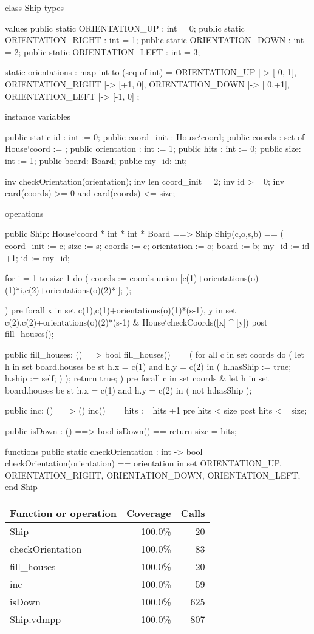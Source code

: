 \begin{vdm_al}
class Ship
 types
  
 values
  public static ORIENTATION_UP : int = 0;
  public static ORIENTATION_RIGHT : int = 1;
  public static ORIENTATION_DOWN : int = 2;
  public static ORIENTATION_LEFT : int = 3;
  
  static orientations : map int to (seq of int) = {
   ORIENTATION_UP  |-> [ 0,-1],
   ORIENTATION_RIGHT |-> [+1, 0],
   ORIENTATION_DOWN |-> [ 0,+1],
   ORIENTATION_LEFT |-> [-1, 0]
  };

 instance variables
 
  public static id : int := 0;
  public coord_init : House`coord;
  public coords : set of House`coord := {};
  public orientation : int := 1;
  public hits : int := 0;
  public size: int := 1;
  public board: Board;
  public my_id: int;
  
  inv checkOrientation(orientation);
  inv len coord_init = 2;
  inv id >= 0;
  inv card(coords) >= 0 and card(coords) <= size;
 
 operations
 
 public Ship: House`coord * int * int * Board ==> Ship
 Ship(c,o,s,b) == 
 (
  coord_init := c;
  size := s;
  coords := {c};
  orientation := o;
  board := b;
  my_id := id +1;
  id := my_id;
  
  for i = 1 to size-1 do ( 
   coords := coords union {[c(1)+orientations(o)(1)*i,c(2)+orientations(o)(2)*i]};
  );
  
 )
 pre forall x in set {c(1),c(1)+orientations(o)(1)*(s-1)}, y in set {c(2),c(2)+orientations(o)(2)*(s-1)} &
   House`checkCoords([x] ^ [y])
 post fill_houses();
 
 public fill_houses: ()==> bool
  fill_houses() ==
  (
   for all c in set coords do
   (
    let h in set board.houses be st h.x = c(1) and h.y = c(2) in
    (
     h.hasShip := true;
     h.ship := self;
    )
   );
   return true;
  )
 pre forall c in set coords &
  let h in set board.houses be st h.x = c(1) and h.y = c(2) in
  (
   not h.hasShip
  );

 public inc: () ==> ()
  inc() == hits := hits +1
 pre hits < size
 post hits <= size;
 
 public isDown : () ==> bool
  isDown() == return size = hits;
  
 functions
  public static checkOrientation : int -> bool
   checkOrientation(orientation) ==
    orientation in set {ORIENTATION_UP, ORIENTATION_RIGHT, ORIENTATION_DOWN, ORIENTATION_LEFT};
end Ship
\end{vdm_al}
\bigskip
\begin{longtable}{|l|r|r|}
\hline
Function or operation & Coverage & Calls \\
\hline
\hline
Ship & 100.0\% & 20 \\
\hline
checkOrientation & 100.0\% & 83 \\
\hline
fill\_houses & 100.0\% & 20 \\
\hline
inc & 100.0\% & 59 \\
\hline
isDown & 100.0\% & 625 \\
\hline
\hline
Ship.vdmpp & 100.0\% & 807 \\
\hline
\end{longtable}

